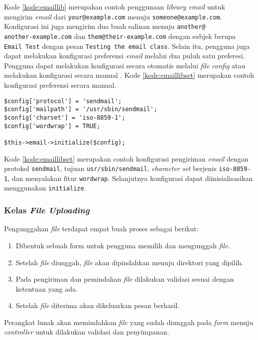Kode \ref{kode:emaillib} merupakan contoh penggunaan \textit{library email} untuk mengirim \textit{email} dari \texttt{your@example.com} menuju \texttt{someone@example.com}. Konfigurasi ini juga mengirim dua buah salinan menuju \texttt{another@\\another-example.com} dan \texttt{them@their-example.com} dengan subjek berupa \texttt{Email Test} dengan pesan \texttt{Testing the email class}. Selain itu, pengguna juga dapat melakukan konfigurasi preferensi \textit{email} melalui dua puluh satu preferesi. Pengguna dapat melakukan konfigurasi secara otomatis melalui \textit{file config} atau melakukan konfigurasi secara manual . Kode \ref{kode:emaillibset} merupakan contoh konfigurasi preferensi secara manual.

\begin{lstlisting}[caption=Contoh konfigurasi preferensi \textit{library email} secara manual, label=kode:emaillibset]
$config['protocol'] = 'sendmail';
$config['mailpath'] = '/usr/sbin/sendmail';
$config['charset'] = 'iso-8859-1';
$config['wordwrap'] = TRUE;

$this->email->initialize($config);
\end{lstlisting}
Kode \ref{kode:emaillibset} merupakan contoh konfigurasi pengiriman \textit{email} dengan protokol \texttt{sendmail}, tujuan \texttt{usr/sbin/sendmail}, \textit{character set} berjenis \texttt{iso-8859-1}, dan menyalakan fitur \texttt{wordwrap}. Selanjutnya konfigurasi dapat diinisialisasikan menggunakan \texttt{initialize}.

\subsubsection{Kelas \textit{File Uploading}}
Pengunggahan \textit{file} terdapat empat buah proses sebagai berikut:
\begin{enumerate}
\item Dibentuk sebuah form untuk pengguna memilih dan mengunggah \textit{file}.
\item Setelah \textit{file} diunggah, \textit{file} akan dipindahkan menuju direktori yang dipilih.
\item Pada pengiriman dan pemindahan \textit{file} dilakukan validasi sesuai dengan ketentuan yang ada.
\item Setelah \textit{file} diterima akan dikeluarkan pesan berhasil.
\end{enumerate}

Perangkat lunak akan memindahkan \textit{file} yang sudah diunggah pada \textit{form} menuju \textit{controller} untuk dilakukan validasi dan penyimpanan.


